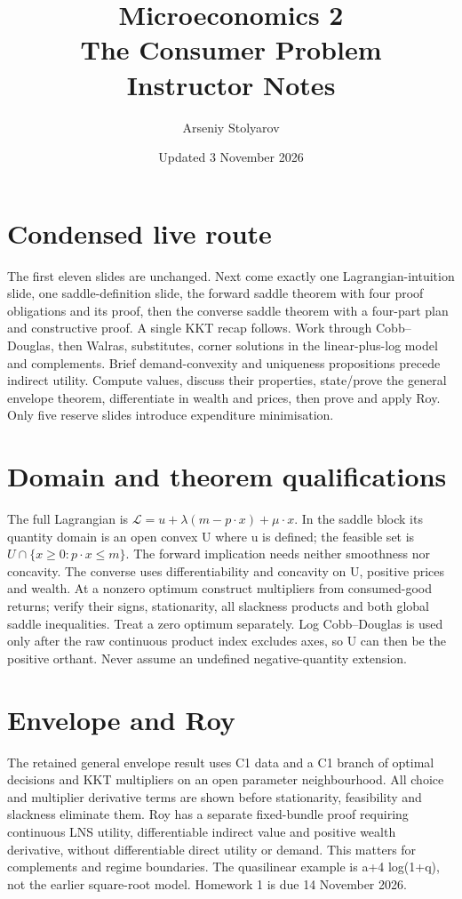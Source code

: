 \documentclass[11pt,a4paper]{article}
\title{Microeconomics 2\\The Consumer Problem\\Instructor Notes}
\author{Arseniy Stolyarov}\date{Updated 3 November 2026}
\begin{document}
\maketitle
\section*{Condensed live route}
The first eleven slides are unchanged. Next come exactly one Lagrangian-intuition slide, one saddle-definition slide, the forward saddle theorem with four proof obligations and its proof, then the converse saddle theorem with a four-part plan and constructive proof. A single KKT recap follows. Work through Cobb--Douglas, then Walras, substitutes, corner solutions in the linear-plus-log model and complements. Brief demand-convexity and uniqueness propositions precede indirect utility. Compute values, discuss their properties, state/prove the general envelope theorem, differentiate in wealth and prices, then prove and apply Roy. Only five reserve slides introduce expenditure minimisation.

\section*{Domain and theorem qualifications}
The full Lagrangian is $\mathcal L=u+\lambda(m-p\cdot x)+\mu\cdot x$. In the saddle block its quantity domain is an open convex U where u is defined; the feasible set is $U\cap\{x\ge0:p\cdot x\le m\}$. The forward implication needs neither smoothness nor concavity. The converse uses differentiability and concavity on U, positive prices and wealth. At a nonzero optimum construct multipliers from consumed-good returns; verify their signs, stationarity, all slackness products and both global saddle inequalities. Treat a zero optimum separately. Log Cobb--Douglas is used only after the raw continuous product index excludes axes, so U can then be the positive orthant. Never assume an undefined negative-quantity extension.

\section*{Envelope and Roy}
The retained general envelope result uses C1 data and a C1 branch of optimal decisions and KKT multipliers on an open parameter neighbourhood. All choice and multiplier derivative terms are shown before stationarity, feasibility and slackness eliminate them. Roy has a separate fixed-bundle proof requiring continuous LNS utility, differentiable indirect value and positive wealth derivative, without differentiable direct utility or demand. This matters for complements and regime boundaries. The quasilinear example is a+4 log(1+q), not the earlier square-root model. Homework 1 is due 14 November 2026.
\end{document}
